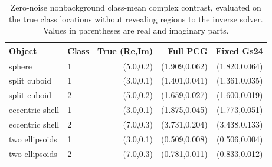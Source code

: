 \begin{table}[tbp]\centering\caption{Zero-noise nonbackground class-mean complex contrast, evaluated on the true class locations without revealing regions to the inverse solver. Values in parentheses are real and imaginary parts.}\label{tab:sharp-class-means}
\begin{tabular}{llrrr}\hline
Object & Class & True (Re,Im) & Full PCG & Fixed Gs24 \\\hline
sphere & 1 & (5.0,0.2) & (1.909,0.062) & (1.820,0.064) \\
split cuboid & 1 & (3.0,0.1) & (1.401,0.041) & (1.361,0.035) \\
split cuboid & 2 & (5.0,0.2) & (1.659,0.027) & (1.600,0.019) \\
eccentric shell & 1 & (3.0,0.1) & (1.875,0.045) & (1.773,0.051) \\
eccentric shell & 2 & (7.0,0.3) & (3.731,0.204) & (3.438,0.133) \\
two ellipsoids & 1 & (3.0,0.1) & (0.509,0.008) & (0.506,0.004) \\
two ellipsoids & 2 & (7.0,0.3) & (0.781,0.011) & (0.833,0.012) \\
\hline\end{tabular}
\end{table}
